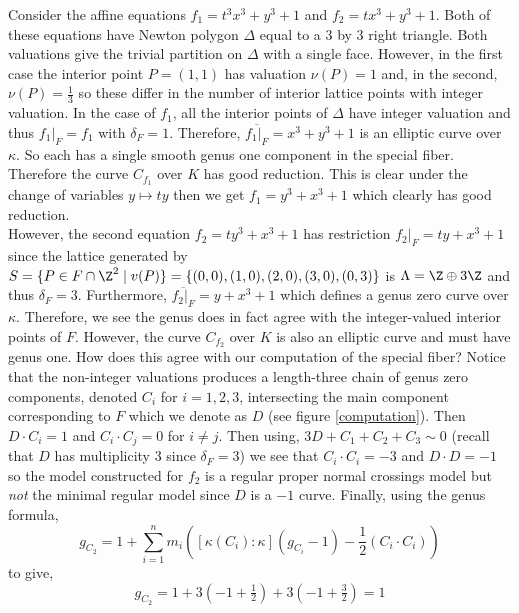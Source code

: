\begin{example}
Consider the affine equations $f_1 = t^3 x^3 + y^3 + 1$ and $f_2 = t x^3 + y^3 + 1$. Both of these equations have Newton polygon $\Delta$ equal to a 3 by 3 right triangle. Both valuations give the trivial partition on $\Delta$ with a single face. However, in the first case the interior point $P = (1,1)$ has valuation $\nu(P) = 1$ and, in the second, $\nu(P) = \tfrac{1}{3}$ so these differ in the number of interior lattice points with integer valuation. In the case of $f_1$, all the interior points of $\Delta$ have integer valuation and thus $f_1 |_F = f_1$ with $\delta_F = 1$. Therefore, $\overline{f_1 |_F} = x^3 + y^3 + 1$ is an elliptic curve over $\kappa$. So each has a single smooth genus one component in the special fiber. Therefore the curve $C_{f_1}$ over $K$ has good reduction. This is clear under the change of variables $y \mapsto t y$ then we get $f_1 = y^3 + x^3 + 1$ which clearly has good reduction. 
\bigskip\\
However, the second equation $f_2  = t y^3 + x^3 + 1$ has restriction $f_2 |_F = t y + x^3 + 1$ since the lattice generated by $S = \{ P \in F \cap \Z^2 \mid v(P) \} = \{ (0,0), (1,0), (2,0), (3,0), (0,3) \}$ is $\Lambda = \Z \oplus 3 \Z$ and thus $\delta_F = 3$. Furthermore, $\overline{f_2 |_F} = y + x^3 + 1$ which defines a genus zero curve over $\kappa$. Therefore, we see the genus does in fact agree with the integer-valued interior points of $F$. However, the curve $C_{f_2}$ over $K$ is also an elliptic curve and must have genus one. How does this agree with our computation of the special fiber? Notice that the non-integer valuations produces a length-three chain of genus zero components, denoted $C_i$ for $i = 1,2,3$, intersecting the main component corresponding to $F$ which we denote as $D$ (see figure \ref{computation}). Then $D \cdot C_i = 1$ and $C_i \cdot C_j = 0$ for $i \neq j$. Then using, $3 D + C_1 + C_2 + C_3 \sim 0$ (recall that $D$ has multiplicity $3$ since $\delta_F = 3$) we see that $C_i \cdot C_i = -3$ and $D \cdot D = -1$ so the model constructed for $f_2$ is a regular proper normal crossings model but \textit{not} the minimal regular model since $D$ is a $-1$ curve. Finally, using the genus formula,
\[ g_{C_2} = 1 + \sum_{i = 1}^n m_i \left( [\kappa(C_i) : \kappa] (g_{C_i} - 1) - \frac{1}{2} (C_i \cdot C_i) \right) \]
to give,
\[ g_{C_2} = 1 + 3 (-1 + \tfrac{1}{2}) + 3 (-1 + \tfrac{3}{2}) = 1 \]


\end{example}
